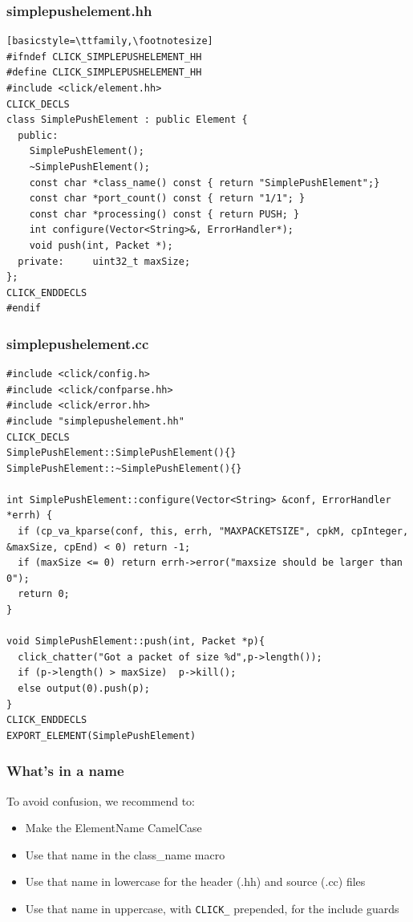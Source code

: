 \documentclass{beamer}
\begin{document}
\begin{frame}[fragile]
\frametitle{simplepushelement.hh}
\begin{lstlisting}[basicstyle=\ttfamily,\footnotesize]
#ifndef CLICK_SIMPLEPUSHELEMENT_HH
#define CLICK_SIMPLEPUSHELEMENT_HH
#include <click/element.hh>
CLICK_DECLS
class SimplePushElement : public Element { 
  public:
    SimplePushElement();
    ~SimplePushElement();
    const char *class_name() const { return "SimplePushElement";}
    const char *port_count() const { return "1/1"; }
    const char *processing() const { return PUSH; }
    int configure(Vector<String>&, ErrorHandler*);
    void push(int, Packet *);
  private:     uint32_t maxSize;
};
CLICK_ENDDECLS
#endif
\end{lstlisting}
\end{frame}

\begin{frame}
\frametitle{simplepushelement.cc}
\begin{lstlisting}[basicstyle=\footnotesize]
#include <click/config.h>
#include <click/confparse.hh>
#include <click/error.hh>
#include "simplepushelement.hh"
CLICK_DECLS
SimplePushElement::SimplePushElement(){}
SimplePushElement::~SimplePushElement(){}

int SimplePushElement::configure(Vector<String> &conf, ErrorHandler *errh) {
  if (cp_va_kparse(conf, this, errh, "MAXPACKETSIZE", cpkM, cpInteger, &maxSize, cpEnd) < 0) return -1;
  if (maxSize <= 0) return errh->error("maxsize should be larger than 0");
  return 0;
}

void SimplePushElement::push(int, Packet *p){
  click_chatter("Got a packet of size %d",p->length());
  if (p->length() > maxSize)  p->kill();
  else output(0).push(p);
}
CLICK_ENDDECLS
EXPORT_ELEMENT(SimplePushElement)
\end{lstlisting}
\end{frame}

\begin{frame}[fragile]
\frametitle{What's in a name}
To avoid confusion, we recommend to:
\begin{itemize}
	\item Make the ElementName CamelCase
	\item Use that name in the class\_name macro
	\item Use that name in lowercase for the header (.hh) and source (.cc) files
	\item Use that name in uppercase, with \lstinline!CLICK_! prepended, for the include guards
\end{itemize}
\end{frame}
\end{document}
